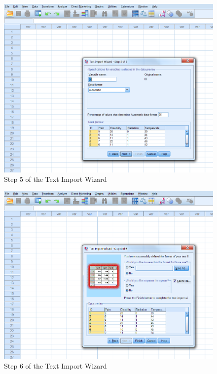 \documentclass[]{book}
\theoremstyle{definition}
\theoremstyle{definition}
\theoremstyle{definition}
\theoremstyle{remark}
\begin{document}
\begin{figure}

{\centering \includegraphics[width=0.9\linewidth]{images/fig1.23} 

}

\caption{Step 5 of the Text Import Wizard}\label{fig:fig23}
\end{figure}

\begin{figure}

{\centering \includegraphics[width=0.9\linewidth]{images/fig1.24} 

}

\caption{Step 6 of the Text Import Wizard}\label{fig:fig24}
\end{figure}
\end{document}
